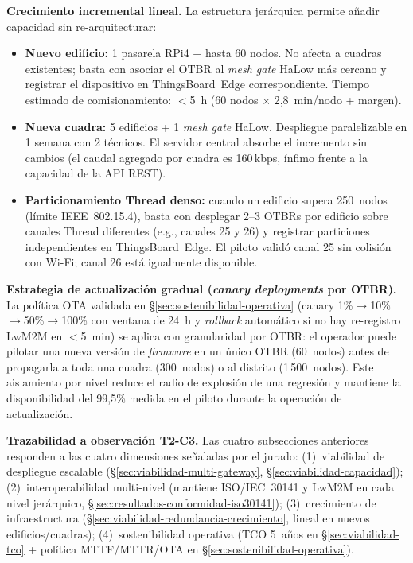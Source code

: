 \textbf{Crecimiento incremental lineal.} La estructura jerárquica permite añadir capacidad sin re-arquitecturar:

\begin{itemize}
    \item \textbf{Nuevo edificio:} 1 pasarela RPi4 + hasta 60 nodos. No afecta a cuadras existentes; basta con asociar el OTBR al \emph{mesh gate} HaLow más cercano y registrar el dispositivo en ThingsBoard~Edge correspondiente. Tiempo estimado de comisionamiento: $<$5~h (60 nodos $\times$ 2{,}8~min/nodo + margen).
    \item \textbf{Nueva cuadra:} 5 edificios + 1 \emph{mesh gate} HaLow. Despliegue paralelizable en 1 semana con 2 técnicos. El servidor central absorbe el incremento sin cambios (el caudal agregado por cuadra es 160\,kbps, ínfimo frente a la capacidad de la API REST).
    \item \textbf{Particionamiento Thread denso:} cuando un edificio supera 250~nodos (límite IEEE~802.15.4), basta con desplegar 2--3 OTBRs por edificio sobre canales Thread diferentes (e.g., canales 25 y 26) y registrar particiones independientes en ThingsBoard~Edge. El piloto validó canal 25 sin colisión con Wi-Fi; canal 26 está igualmente disponible.
\end{itemize}

\textbf{Estrategia de actualización gradual (\emph{canary deployments} por OTBR).} La política OTA validada en §\ref{sec:sostenibilidad-operativa} (canary 1\%$\rightarrow$10\%$\rightarrow$50\%$\rightarrow$100\% con ventana de 24~h y \emph{rollback} automático si no hay re-registro LwM2M en $<$5~min) se aplica con granularidad por OTBR: el operador puede pilotar una nueva versión de \emph{firmware} en un único OTBR (60~nodos) antes de propagarla a toda una cuadra (300~nodos) o al distrito (1\,500~nodos). Este aislamiento por nivel reduce el radio de explosión de una regresión y mantiene la disponibilidad del 99{,}5\% medida en el piloto durante la operación de actualización.

\textbf{Trazabilidad a observación T2-C3.} Las cuatro subsecciones anteriores responden a las cuatro dimensiones señaladas por el jurado: (1)~viabilidad de despliegue escalable (§\ref{sec:viabilidad-multi-gateway}, §\ref{sec:viabilidad-capacidad}); (2)~interoperabilidad multi-nivel (mantiene ISO/IEC~30141 y LwM2M en cada nivel jerárquico, §\ref{sec:resultados-conformidad-iso30141}); (3)~crecimiento de infraestructura (§\ref{sec:viabilidad-redundancia-crecimiento}, lineal en nuevos edificios/cuadras); (4)~sostenibilidad operativa (TCO 5~años en §\ref{sec:viabilidad-tco} + política MTTF/MTTR/OTA en §\ref{sec:sostenibilidad-operativa}).


